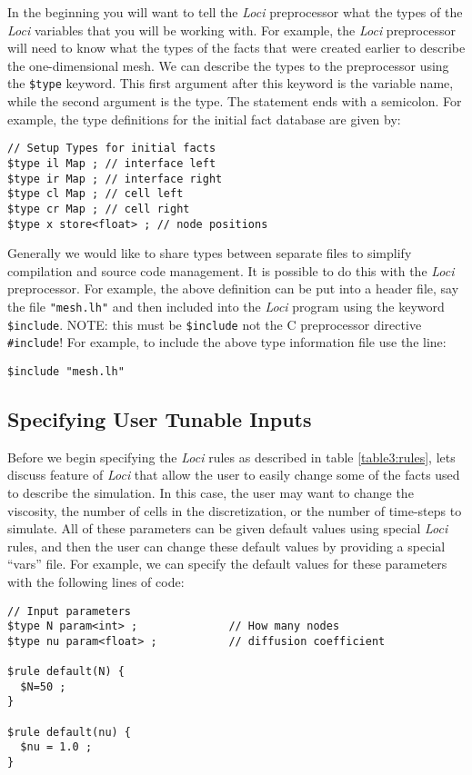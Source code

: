 \documentclass[10pt,epsf]{book}
\begin{document}
In the beginning you will want to tell the {\it Loci} preprocessor what the
types of the {\it Loci} variables that you will be working with.  For
example, the {\it Loci} preprocessor will need to know what the types of the
facts that were created earlier to describe the one-dimensional mesh.
We can describe the types to the preprocessor using the {\tt \$type}
keyword.  This first argument after this keyword is the variable name,
while the second argument is the type.  The statement ends with a
semicolon.  For example, the type definitions for the initial fact
database are given by:
\begin{verbatim}
// Setup Types for initial facts
$type il Map ; // interface left
$type ir Map ; // interface right
$type cl Map ; // cell left
$type cr Map ; // cell right
$type x store<float> ; // node positions
\end{verbatim}

Generally we would like to share types between separate files to
simplify compilation and source code management.  It is possible to do
this with the {\it Loci} preprocessor.  For example, the above definition
can be put into a header file, say the file {\tt "mesh.lh"} and then
included into the {\it Loci} program using the keyword {\tt \$include}.
NOTE: this must be {\tt \$include} not the C preprocessor directive
{\tt \#include}!  For example, to include the above type information
file use the line:
\begin{verbatim}
$include "mesh.lh"
\end{verbatim}

\subsection{Specifying User Tunable Inputs}
Before we begin specifying the {\it Loci} rules as described in table
\ref{table3:rules}, lets discuss feature of {\it Loci} that allow the user
to easily change some of the facts used to describe the simulation.
In this case, the user may want to change the viscosity, the number of
cells in the discretization, or the number of time-steps to simulate.
All of these parameters can be given default values using special {\it Loci}
rules, and then the user can change these default values by providing
a special ``vars'' file.  For example, we can specify the default
values for these parameters with the following lines of code:
\begin{verbatim}
// Input parameters
$type N param<int> ;              // How many nodes
$type nu param<float> ;           // diffusion coefficient

$rule default(N) {
  $N=50 ;
}

$rule default(nu) {
  $nu = 1.0 ;
}
\end{verbatim}
\end{document}
